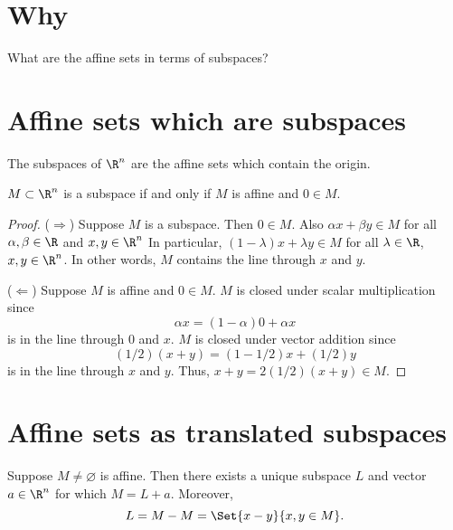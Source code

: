 

\section*{Why}

What are the affine sets in terms of subspaces?

\section*{Affine sets which are subspaces}

The subspaces of $\R ^n$ are the affine sets which contain the origin.

\begin{proposition}
$M \subset \R ^n$ is a subspace if and only if $M$ is affine and $0 \in M$.
\begin{proof}
($\Rightarrow$)
Suppose $M$ is a subspace.
Then $0 \in M$.
Also $\alpha x + \beta y \in M$ for all $\alpha , \beta  \in \R $ and $x, y \in \R ^n$
In particular, $(1- \lambda )x + \lambda y \in M$ for all $\lambda  \in \R $, $x, y \in \R ^n$.
In other words, $M$ contains the line through $x$ and $y$.

($\Leftarrow$) Suppose $M$ is affine and $0 \in M$.
$M$ is closed under scalar multiplication since
\[
\alpha x = (1 - \alpha )0 + \alpha x
\]
is in the line through $0$ and $x$.
$M$ is closed under vector addition since
\[
(1/2)(x + y) = (1-1/2)x + (1/2)y
\]
is in the line through $x$ and $y$.
Thus, $x+y = 2(1/2)(x+y) \in M$.\end{proof}
\end{proposition}

\section*{Affine sets as translated subspaces}

\begin{proposition}
Suppose $M \neq \varnothing$ is affine.
Then there exists a unique subspace $L$ and vector $a \in \R ^n$ for which $M = L + a$.
Moreover,
\[
L = M - M = \Set{x - y}{x,y \in M}.
\]
\end{proposition}

